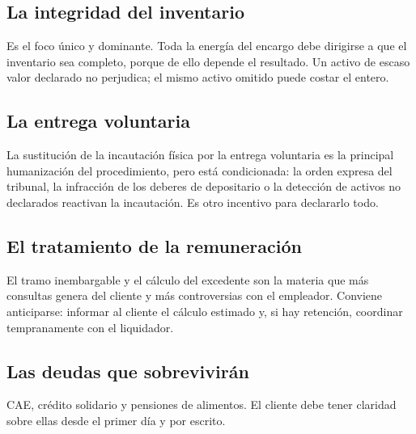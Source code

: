 \bloqueFocos

\subsection{La integridad del inventario}

Es el foco único y dominante. Toda la energía del encargo debe dirigirse a que el
inventario sea completo, porque de ello depende el resultado. Un activo de escaso valor
declarado no perjudica; el mismo activo omitido puede costar el \discharge{} entero.

\subsection{La entrega voluntaria}

La sustitución de la incautación física por la entrega voluntaria es la principal
humanización del procedimiento, pero está condicionada: la orden expresa del tribunal, la
infracción de los deberes de depositario o la detección de activos no declarados
reactivan la incautación. Es otro incentivo para declararlo todo.

\subsection{El tratamiento de la remuneración}

El tramo inembargable y el cálculo del excedente son la materia que más consultas genera
del cliente y más controversias con el empleador. Conviene anticiparse: informar al
cliente el cálculo estimado y, si hay retención, coordinar tempranamente con el
liquidador.

\subsection{Las deudas que sobrevivirán}

CAE, crédito solidario y pensiones de alimentos. El cliente debe tener claridad sobre
ellas desde el primer día y por escrito.

\bloqueCronograma

